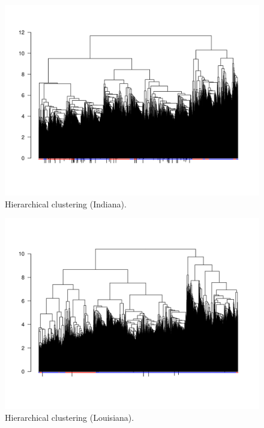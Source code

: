 \documentclass[11pt]{article}
\begin{document}
\begin{figure}[!ht]
	\centering %
	\caption{Hierarchical clustering (Indiana).}
	\label{hclustIN}
	\includegraphics[width=\linewidth]{figures/clusteringIN.png}
\end{figure}

\begin{figure}[!ht]
	\centering %
	\caption{Hierarchical clustering (Louisiana).}
	\label{hclustLA}
	\includegraphics[width=\linewidth]{figures/clusteringLA.png}
\end{figure}
\end{document}

